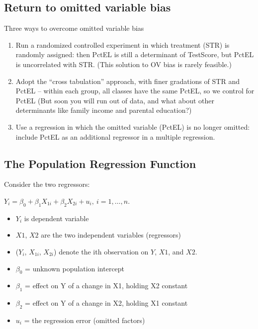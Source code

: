 \documentclass[
  letterpaper,
  DIV=11,
  numbers=noendperiod]{scrartcl}
\begin{document}
\hypertarget{return-to-omitted-variable-bias}{%
\subsection{Return to omitted variable
bias}\label{return-to-omitted-variable-bias}}

Three ways to overcome omitted variable bias

\begin{enumerate}
\def\labelenumi{\arabic{enumi}.}
\item
  Run a randomized controlled experiment in which treatment (STR) is
  randomly assigned: then PctEL is still a determinant of TestScore, but
  PctEL is uncorrelated with STR. (This solution to OV bias is rarely
  feasible.)
\item
  Adopt the ``cross tabulation'' approach, with finer gradations of STR
  and PctEL -- within each group, all classes have the same PctEL, so we
  control for PctEL (But soon you will run out of data, and what about
  other determinants like family income and parental education?)
\item
  Use a regression in which the omitted variable (PctEL) is no longer
  omitted: include PctEL as an additional regressor in a multiple
  regression.
\end{enumerate}

\hypertarget{the-population-regression-function}{%
\subsection{The Population Regression
Function}\label{the-population-regression-function}}

Consider the two regressors:

\(Y_i = \beta_0 + \beta_1 X_{1i} + \beta_2 X_{2i} + u_i, \ i=1,\dots,n.\)

\begin{itemize}
\item
  \(Y_i\) is dependent variable
\item
  \(X1\), \(X2\) are the two independent variables (regressors)
\item
  (\(Y_i\), \(X_{1i}\), \(X_{2i}\)) denote the ith observation on \(Y\),
  \(X1\), and \(X2\).
\item
  \(\beta_0\) = unknown population intercept
\item
  \(\beta_1\) = effect on Y of a change in X1, holding X2 constant
\item
  \(\beta_2\) = effect on Y of a change in X2, holding X1 constant
\item
  \(u_i\) = the regression error (omitted factors)
\end{itemize}
\end{document}
